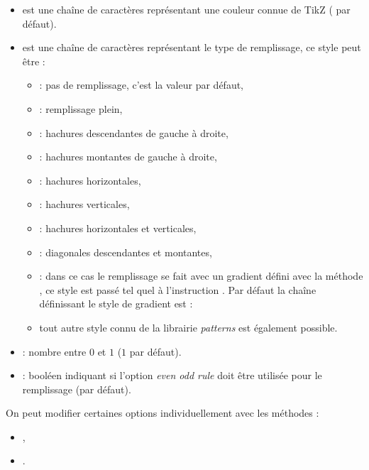 \begin{itemize}
  \item {} est une chaîne de caractères représentant une couleur connue de TikZ ( par défaut).
  \item {} est une chaîne de caractères représentant le type de remplissage, ce style peut être :
      \begin{itemize}
      \item {} : pas de remplissage, c'est la valeur par défaut,
      \item {} : remplissage plein,
      \item {} : hachures descendantes de gauche à droite,
      \item {} : hachures montantes de gauche à droite,
      \item {} : hachures horizontales,
      \item {} : hachures verticales,
      \item {} : hachures horizontales et verticales,
      \item {} : diagonales descendantes et montantes,
      \item {} : dans ce cas le remplissage se fait avec un gradient défini avec la méthode , ce style est passé tel quel à l'instruction \drawcmd. Par défaut la chaîne définissant le style de gradient est : 
      \item tout autre style connu de la librairie \emph{patterns} est également possible.
      \end{itemize}
  \item {} : nombre entre $0$ et $1$ ($1$ par défaut).
  \item {} : booléen indiquant si l'option \emph{even odd rule} doit être utilisée pour le remplissage (\false par défaut).
\end{itemize}

On peut modifier certaines options individuellement avec les méthodes :
\begin{itemize}
    \item {}, 
    \item {}.
\end{itemize}

